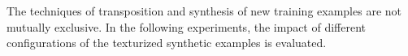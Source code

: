 
The techniques of transposition and synthesis of new
training examples are not mutually exclusive. In the
following experiments, the impact of different
configurations of the texturized synthetic examples is
evaluated.
